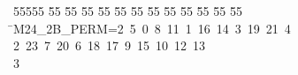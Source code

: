 %
%
\begin{tabbing}
55555 \= 55 \= 55 \= 55 \= 55 \= 55 \= 55 \= 55 \= 55 \= 55 \= 55 \= 55 \= 55 \= \>M24\_2B\_PERM=2\ 5\ 0\ 8\ 11\ 1\ 16\ 14\ 3\ 19\ 21\ 4\ \\[0pt]
2\ 23\ 7\ 20\ 6\ 18\ 17\ 9\ 15\ 10\ 12\ 13\\[0pt]
3\>\end{tabbing}
